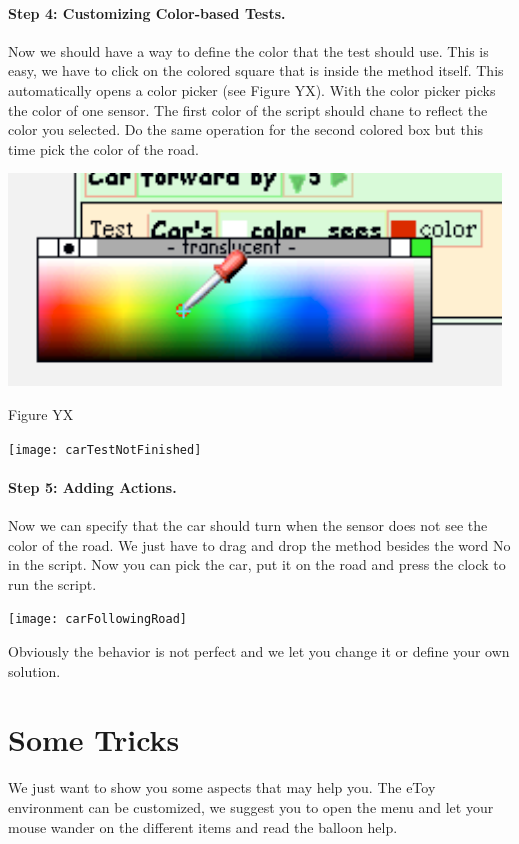 \paragraph{Step 4: Customizing Color-based Tests.}
Now we should have a way to define the color that the test should use. This is easy, we have to click on the colored square that is inside the method  itself. This automatically opens a color picker (see Figure YX). With the color picker picks the color  
of one sensor. The first color of the script should chane to reflect the color you selected. Do the same operation for the second colored box but this time pick the color of the road.  
\begin{center}\includegraphics[]{colorPicker}\end{center}
Figure YX
\begin{center}\texttt{[image: carTestNotFinished]}\end{center}

\paragraph{Step 5: Adding Actions.}
Now we can specify that the car should turn when the sensor does not see the color of the road. We just have to drag and drop the method  besides the word No in the script. Now you can pick the car, put it on the road and press the clock to run the script. 
\begin{center}\texttt{[image: carFollowingRoad]}\end{center}

Obviously the behavior is not perfect and we let you change it or define your own solution. 



\section{Some Tricks}
We just want to show you some aspects that may help you. The eToy environment can be customized, we suggest you to open the menu  and let your mouse wander on the different items and read the balloon help.

